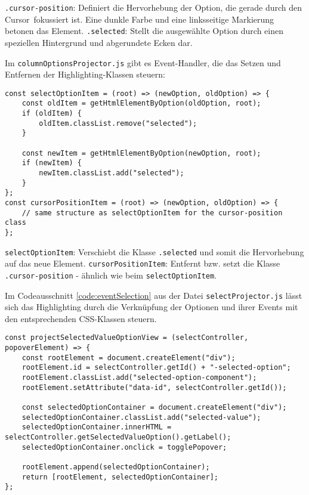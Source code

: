 \texttt{.cursor-position}: Definiert die Hervorhebung der Option, die gerade durch den Cursor\footnotemark \ fokussiert ist.
Eine dunkle Farbe und eine linksseitige Markierung betonen das Element.
\texttt{.selected}: Stellt die ausgewählte Option durch einen speziellen Hintergrund und abgerundete Ecken dar.

Im \texttt{columnOptionsProjector.js} gibt es Event-Handler, die das Setzen und Entfernen der Highlighting-Klassen steuern:

\begin{lstlisting}[style = htmlcssjs, caption = Steurung der Highlighting-Klassen, label = code:highlightChange]
const selectOptionItem = (root) => (newOption, oldOption) => {
    const oldItem = getHtmlElementByOption(oldOption, root);
    if (oldItem) {
        oldItem.classList.remove("selected");
    }

    const newItem = getHtmlElementByOption(newOption, root);
    if (newItem) {
        newItem.classList.add("selected");
    }
}; 
const cursorPositionItem = (root) => (newOption, oldOption) => {
    // same structure as selectOptionItem for the cursor-position class
}; 
\end{lstlisting}

\texttt{selectOptionItem}: Verschiebt die Klasse \texttt{.selected} und somit die Hervorhebung auf das neue Element.
\texttt{cursorPositionItem}: Entfernt bzw. setzt die Klasse \texttt{.cursor-position} - ähnlich wie beim \texttt{selectOptionItem}. 

Im Codeausschnitt \ref{code:eventSelection} aus der Datei \texttt{selectProjector.js} lässt sich das Highlighting 
durch die Verknüpfung der Optionen und ihrer Events mit den entsprechenden CSS-Klassen steuern.

\begin{lstlisting}[style = htmlcssjs, caption = Event-Handling für die Auswahl einer Option, label = code:eventSelection]
const projectSelectedValueOptionView = (selectController, popoverElement) => {
    const rootElement = document.createElement("div");
    rootElement.id = selectController.getId() + "-selected-option";
    rootElement.classList.add("selected-option-component");
    rootElement.setAttribute("data-id", selectController.getId());
    
    const selectedOptionContainer = document.createElement("div");
    selectedOptionContainer.classList.add("selected-value");
    selectedOptionContainer.innerHTML = selectController.getSelectedValueOption().getLabel();
    selectedOptionContainer.onclick = togglePopover;
    
    rootElement.append(selectedOptionContainer);
    return [rootElement, selectedOptionContainer];
}; 
\end{lstlisting}

